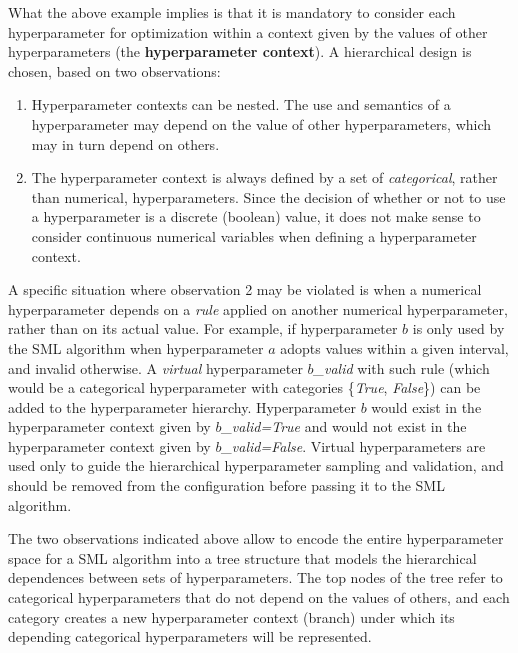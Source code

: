 	What the above example implies is that it is mandatory to consider each hyperparameter for
	optimization within a context given by the values of other hyperparameters (the {\bf
	hyperparameter context}). A hierarchical design is chosen, based on two observations:
	\begin{enumerate}
		\item
		Hyperparameter contexts can be nested. The use and semantics of a hyperparameter may depend
		on the value of other hyperparameters, which may in turn depend on others.
		\item
		The hyperparameter context is always defined by a set of \emph{categorical}, rather than
		numerical, hyperparameters. Since the decision of whether or not to use a hyperparameter is
		a discrete (boolean) value, it does not make sense to consider continuous numerical
		variables when defining a hyperparameter context.
		
	\end{enumerate}

	A specific situation where observation 2 may be violated is when a numerical hyperparameter depends
	on a \emph{rule} applied on another numerical hyperparameter, rather than on its actual value. For
	example, if hyperparameter $b$ is only used by the SML algorithm when hyperparameter $a$ adopts
	values within a given interval, and invalid otherwise. A \emph{virtual} hyperparameter
	\emph{$b$\_valid} with such rule (which would be a categorical hyperparameter with categories
	\{\emph{True}, \emph{False}\}) can be added to the hyperparameter hierarchy. Hyperparameter
	$b$ would exist in the hyperparameter context given by \emph{$b$\_valid=True} and would not
	exist in the hyperparameter context given by \emph{$b$\_valid=False}. Virtual hyperparameters
	are used only to guide the hierarchical hyperparameter sampling and validation, and should be
	removed from the configuration before passing it to the SML algorithm.

	The two observations indicated above allow to encode the entire hyperparameter space for a SML
	algorithm into a tree structure that models the hierarchical dependences between sets of
	hyperparameters. The top nodes of the tree refer to categorical hyperparameters that do not
	depend on the values of others, and each category creates a new hyperparameter context (branch)
	under which its depending categorical hyperparameters will be represented.
	
